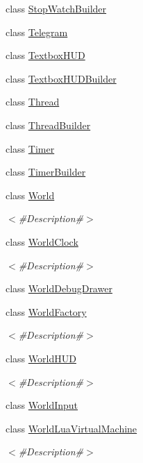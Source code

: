 \begin{DoxyCompactItemize}
class \mbox{\hyperlink{classnjli_1_1_stop_watch_builder}{Stop\+Watch\+Builder}}
\item 
class \mbox{\hyperlink{classnjli_1_1_telegram}{Telegram}}
\item 
class \mbox{\hyperlink{classnjli_1_1_textbox_h_u_d}{Textbox\+H\+UD}}
\item 
class \mbox{\hyperlink{classnjli_1_1_textbox_h_u_d_builder}{Textbox\+H\+U\+D\+Builder}}
\item 
class \mbox{\hyperlink{classnjli_1_1_thread}{Thread}}
\item 
class \mbox{\hyperlink{classnjli_1_1_thread_builder}{Thread\+Builder}}
\item 
class \mbox{\hyperlink{classnjli_1_1_timer}{Timer}}
\item 
class \mbox{\hyperlink{classnjli_1_1_timer_builder}{Timer\+Builder}}
\item 
class \mbox{\hyperlink{classnjli_1_1_world}{World}}
\begin{DoxyCompactList}\small\item\em $<$\#\+Description\#$>$ \end{DoxyCompactList}\item 
class \mbox{\hyperlink{classnjli_1_1_world_clock}{World\+Clock}}
\begin{DoxyCompactList}\small\item\em $<$\#\+Description\#$>$ \end{DoxyCompactList}\item 
class \mbox{\hyperlink{classnjli_1_1_world_debug_drawer}{World\+Debug\+Drawer}}
\item 
class \mbox{\hyperlink{classnjli_1_1_world_factory}{World\+Factory}}
\begin{DoxyCompactList}\small\item\em $<$\#\+Description\#$>$ \end{DoxyCompactList}\item 
class \mbox{\hyperlink{classnjli_1_1_world_h_u_d}{World\+H\+UD}}
\begin{DoxyCompactList}\small\item\em $<$\#\+Description\#$>$ \end{DoxyCompactList}\item 
class \mbox{\hyperlink{classnjli_1_1_world_input}{World\+Input}}
\item 
class \mbox{\hyperlink{classnjli_1_1_world_lua_virtual_machine}{World\+Lua\+Virtual\+Machine}}
\begin{DoxyCompactList}\small\item\em $<$\#\+Description\#$>$ \end{DoxyCompactList}\item 

\end{DoxyCompactItemize}
